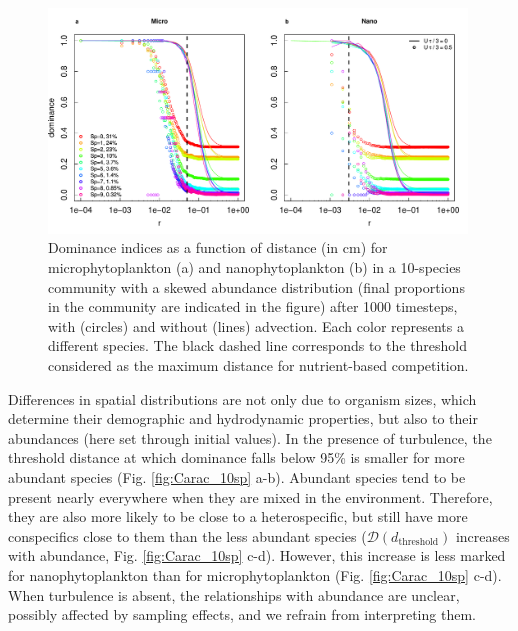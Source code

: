 \documentclass[english]{article}
\begin{document}
\begin{figure}[H]
\begin{centering}
\includegraphics[width=0.99\textwidth]{../code/figure/dominance_diatom_nano_compare_advection_10sp}
\par\end{centering}
\caption{Dominance indices as a function of distance (in cm) for microphytoplankton
(a) and nanophytoplankton (b) in a 10-species community with a skewed
abundance distribution (final proportions in the community are indicated
in the figure) after 1000 timesteps, with (circles) and without (lines)
advection. Each color represents a different species. The black dashed
line corresponds to the threshold considered as the maximum distance
for nutrient-based competition.\label{fig:Dominance-10sp}}
\end{figure}

Differences in spatial distributions are not only due to organism
sizes, which determine their demographic and hydrodynamic properties,
but also to their abundances (here set through initial values). In
the presence of turbulence, the threshold distance at which dominance
falls below 95\% is smaller for more abundant species (Fig. \ref{fig:Carac_10sp}
a-b). Abundant species tend to be present nearly everywhere when they
are mixed in the environment. Therefore, they are also more likely
to be close to a heterospecific, but still have more conspecifics
close to them than the less abundant species ($\mathcal{D}\left(d_{\text{threshold}}\right)$
increases with abundance, Fig. \ref{fig:Carac_10sp} c-d). However,
this increase is less marked for nanophytoplankton than for microphytoplankton
(Fig. \ref{fig:Carac_10sp} c-d). When turbulence is absent, the relationships
with abundance are unclear, possibly affected by sampling effects,
and we refrain from interpreting them.
\end{document}
